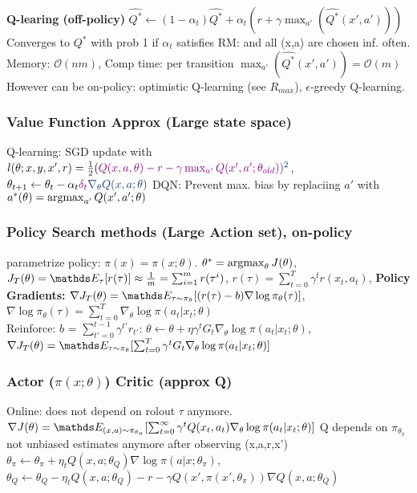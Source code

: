 \textbf{Q-learing (off-policy)}
$\hat{Q^*} \leftarrow (1-\alpha_{t})\hat{Q^*} + \alpha_t (r + \gamma \max_{a'}(\hat{Q^*}(x',a')))$
Converges to $Q^*$ with prob 1 if $\alpha_{t}$ satisfies \color{magenta}RM:\color{black} and
all (x,a) are chosen inf. often.
Memory: $\mathcal{O}(nm)$, Comp time: per transition $\max_{a'}(\hat{Q^*}(x',a')) = \mathcal{O}(m)$
However can be on-policy:
optimistic Q-learning (see $R_{max}$), $\epsilon$-greedy Q-learning.

\subsubsection{Value Function Approx (Large state space)}
Q-learning: SGD update with $l(\theta; x,y,x',r) = \frac{1}{2}(
\color{violet}Q(x,a,\theta) -r -\gamma \max_{a'}Q(x',a'; \theta_{old})\color{myblue})^2$,
$\theta_{t+1} \leftarrow \theta_{t} - \alpha_{t} \color{violet}\delta_{t} \color{myblue} \nabla_{\theta}Q(x,a;\theta)$
DQN: Prevent max. bias by replaciing $a'$ with $a^*(\theta) = \operatorname*{argmax}_{a'}Q(x',a';\theta)$

\subsubsection{Policy Search methods (Large Action set), on-policy}
parametrize policy: $\pi(x)= \pi(x;\theta)$. $\theta^* =\operatorname*{argmax}_{\theta}J(\theta)$,
$J_T(\theta)=\E[\tau]{r(\tau)} \approx \frac{1}{m} = \sum_{i=1}^{m}r(\tau^{i})$,
$r(\tau) = \sum_{t=0}^{T}\gamma^t r(x_t, a_t)$,
\textbf{Policy Gradients:}
$\nabla J_T(\theta) = \E[\tau \sim \pi_{\theta}]{(r(\tau) - b) \nabla \log \pi_{\theta}(\tau)}$,
$\nabla \log \pi_{\theta}(\tau) = \sum_{t=0}^{T} \nabla_{\theta}
\log \pi(a_t|x_t; \theta)$\\
Reinforce: $b$ = $\sum_{t'=0}^{t-1} \gamma^{t'}r_{t'}$:
$\theta \leftarrow \theta + \eta \gamma^t G_t \nabla_{\theta} \log \pi(a_t|x_t; \theta)$,
$\nabla J_T(\theta) = \E[\tau \sim \pi_{\theta}]{\sum_{t=0}^{T}\gamma^t G_t \nabla_{\theta} \log \pi(a_t|x_t; \theta)}$

\subsubsection{Actor ($\pi(x; \theta)$) Critic (approx Q)}
Online: does not depend on rolout $\tau$ anymore.
$\nabla J(\theta) = \E[(x,a) \sim \pi_{\theta_\pi}]{\sum_{t=0}^{\infty}\gamma^t Q(x_t, a_t)
    \nabla_{\theta} \log \pi(a_t|x_t; \theta)}$
Q depends on $\pi_{\theta_\pi}$ \textrightarrow not unbiased estimates anymore
after observing (x,a,r,x')
$\theta_\pi \leftarrow \theta_\pi + \eta_t Q(x,a;\theta_Q) \nabla \log \pi(a|x; \theta_{\pi})$,
$\theta_{Q} \leftarrow \theta_{Q} - \eta_t Q(x,a;\theta_Q) -r - \gamma Q(x', \pi(x', \theta_{\pi})) \nabla Q(x,a;\theta_Q)$





